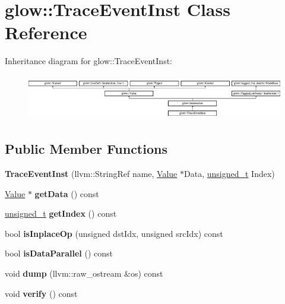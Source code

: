 \hypertarget{classglow_1_1_trace_event_inst}{}\section{glow\+:\+:Trace\+Event\+Inst Class Reference}
\label{classglow_1_1_trace_event_inst}
Inheritance diagram for glow\+:\+:Trace\+Event\+Inst\+:\begin{figure}[H]
\begin{center}
\leavevmode
\includegraphics[height=1.991111cm]{classglow_1_1_trace_event_inst}
\end{center}
\end{figure}
\subsection*{Public Member Functions}
\begin{DoxyCompactItemize}
\item 
\mbox{\label{classglow_1_1_trace_event_inst_a76525d51709e72ba97cc24afc9e37e89}} 
{\bfseries Trace\+Event\+Inst} (llvm\+::\+String\+Ref name, \hyperlink{classglow_1_1_value}{Value} $\ast$Data, \hyperlink{namespaceglow_a0ca574644e1e42ef193a9947fb4d8911}{unsigned\+\_\+t} Index)
\item 
\mbox{\label{classglow_1_1_trace_event_inst_aedebdd6caf0c7983ab7c9dae7d850965}} 
\hyperlink{classglow_1_1_value}{Value} $\ast$ {\bfseries get\+Data} () const
\item 
\mbox{\label{classglow_1_1_trace_event_inst_a4b3050bd249b3910d280889bc8486a22}} 
\hyperlink{namespaceglow_a0ca574644e1e42ef193a9947fb4d8911}{unsigned\+\_\+t} {\bfseries get\+Index} () const
\item 
\mbox{\label{classglow_1_1_trace_event_inst_adf5fec53c9ae40db4568680b57176ddd}} 
bool {\bfseries is\+Inplace\+Op} (unsigned dst\+Idx, unsigned src\+Idx) const
\item 
\mbox{\label{classglow_1_1_trace_event_inst_a19b83655f289dc4d1aa83938006965c3}} 
bool {\bfseries is\+Data\+Parallel} () const
\item 
\mbox{\label{classglow_1_1_trace_event_inst_a1ac8a8409d18e6ba1d89fa7cafda3c07}} 
void {\bfseries dump} (llvm\+::raw\+\_\+ostream \&os) const
\item 
\mbox{\label{classglow_1_1_trace_event_inst_a90daa930ef165b77ceba46054ad8d924}} 
void {\bfseries verify} () const
\end{DoxyCompactItemize}
